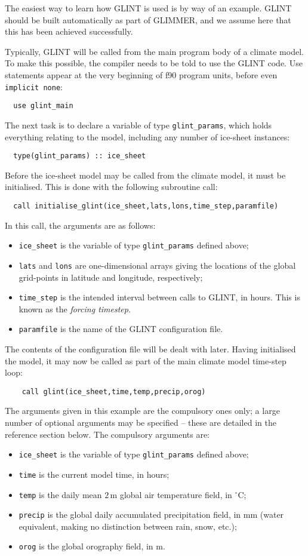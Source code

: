 The easiest way to learn how GLINT is used is by way of an
example. GLINT should be built automatically as part of GLIMMER, and we assume
here that this has been achieved successfully.

Typically, GLINT will be called from the main program body of a
climate model. To make this possible, the compiler needs to be told to use the
GLINT code. Use statements appear at the very beginning of f90 program
units, before even \texttt{implicit none}:
%
\begin{verbatim}
  use glint_main
\end{verbatim}
%
The next task is to declare a variable of type \texttt{glint\_params}, which
holds everything relating to the model, including any number of ice-sheet
instances:
%
\begin{verbatim}
  type(glint_params) :: ice_sheet
\end{verbatim}
%
Before the ice-sheet model may be called from the climate model, it must be
initialised. This is done with the following subroutine call:
%
\begin{verbatim}
  call initialise_glint(ice_sheet,lats,lons,time_step,paramfile)
\end{verbatim}
%
In this call, the arguments are as follows:
%
\begin{itemize}
\item \texttt{ice\_sheet} is the variable of type \texttt{glint\_params}
 defined above;
\item \texttt{lats} and \texttt{lons} are one-dimensional arrays giving the
  locations of the global grid-points in latitude and longitude, respectively;
\item \texttt{time\_step} is the intended interval between calls to GLINT, in
hours. This is known as the \emph{forcing timestep}. 
\item \texttt{paramfile} is the name of the GLINT configuration file.
\end{itemize}
%
The contents of the configuration file will be dealt with later. Having
initialised the model, it may now be called as part of the main climate
model time-step loop:
%
\begin{verbatim}
    call glint(ice_sheet,time,temp,precip,orog)
\end{verbatim} 
%
The arguments given in this example are the compulsory ones only; a large number of
optional arguments may be specified -- these are detailed in the reference
section below. The compulsory arguments are:
%
\begin{itemize}
\item \texttt{ice\_sheet} is the variable of type \texttt{glint\_params}
 defined above;
\item \texttt{time} is the current model time, in hours;
\item \texttt{temp} is the daily mean $2\,\mathrm{m}$ global air temperature field, in
  $^{\circ}\mathrm{C}$;
\item \texttt{precip} is the global daily accumulated precipitation field,
  in $\mathrm{mm}$ (water equivalent, making no distinction
  between rain, snow, etc.);
\item \texttt{orog} is the global orography field, in $\mathrm{m}$.
\end{itemize}
